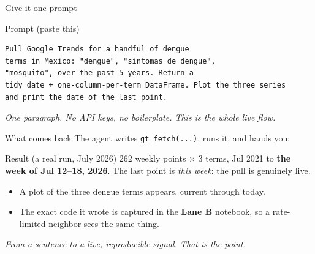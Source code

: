 \documentclass[aspectratio=169,11pt]{beamer}
\begin{document}
\begin{frame}[fragile]{Give it one prompt}
  \begin{block}{Prompt (paste this)}
  \begin{lstlisting}
Pull Google Trends for a handful of dengue
terms in Mexico: "dengue", "sintomas de dengue",
"mosquito", over the past 5 years. Return a
tidy date + one-column-per-term DataFrame. Plot the three series
and print the date of the last point.
  \end{lstlisting}
  \end{block}
  \begin{center}
    \itshape One paragraph. No API keys, no boilerplate. This is the whole live flow.
  \end{center}
\end{frame}

\begin{frame}{What comes back}
  The agent writes \texttt{gt\_fetch(...)}, runs it, and hands you:
  \begin{exampleblock}{Result (a real run, July 2026)}
    262 weekly points $\times$ 3 terms, Jul 2021 to \textbf{the week of Jul 12--18, 2026}.
    The last point is \emph{this week}: the pull is genuinely live.
  \end{exampleblock}
  \begin{itemize}
    \item A plot of the three dengue terms appears, current through today.
    \item The exact code it wrote is captured in the \textbf{Lane B} notebook, so a
          rate-limited neighbor sees the same thing.
  \end{itemize}
  \vspace{0.1em}
  \begin{center}
    \itshape From a sentence to a live, reproducible signal. That is the point.
  \end{center}
\end{frame}
\end{document}

